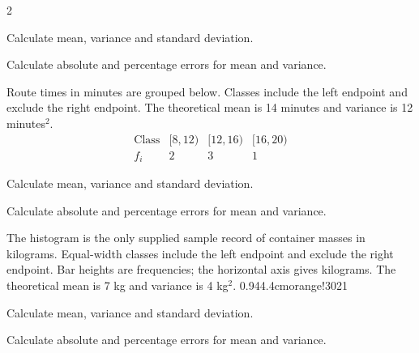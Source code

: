 \begin{multicols}{2}
\begin{minipage}{\linewidth}
Calculate mean, variance and standard deviation. 

Calculate absolute and percentage errors for mean and variance. 

\end{minipage}\par
\begin{minipage}{\linewidth}
Route times in minutes are grouped below. Classes include the left endpoint and exclude the right endpoint. The theoretical mean is 14 minutes and variance is 12 minutes$^2$.
\[
\begin{array}{c|rrr}
\text{Class}&[8,12)&[12,16)&[16,20)\\\hline
f_i&2&3&1
\end{array}
\]

Calculate mean, variance and standard deviation. 

Calculate absolute and percentage errors for mean and variance. 

\end{minipage}\par
\begin{minipage}{\linewidth}
The histogram is the only supplied sample record of container masses in kilograms. Equal-width classes include the left endpoint and exclude the right endpoint. Bar heights are frequencies; the horizontal axis gives kilograms. The theoretical mean is 7 kg and variance is 4 kg$^2$.
{0.94\linewidth}{4.4cm}{orange!30}{2}{1}

Calculate mean, variance and standard deviation. 

Calculate absolute and percentage errors for mean and variance. 

\end{minipage}\par
\end{multicols}


